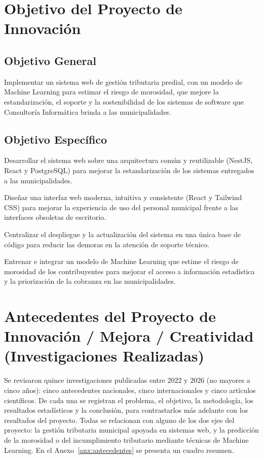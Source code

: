 \documentclass[12pt,a4paper]{report}
\begin{document}
\section{Objetivo del Proyecto de Innovación}

\subsection{Objetivo General}

Implementar un sistema web de gestión tributaria predial, con un modelo de Machine Learning para estimar el riesgo de morosidad, que mejore la estandarización, el soporte y la sostenibilidad de los sistemas de software que Consultoría Informática brinda a las municipalidades.

\subsection{Objetivo Específico}

Desarrollar el sistema web sobre una arquitectura común y reutilizable (NestJS, React y PostgreSQL) para mejorar la estandarización de los sistemas entregados a las municipalidades.

Diseñar una interfaz web moderna, intuitiva y consistente (React y Tailwind CSS) para mejorar la experiencia de uso del personal municipal frente a las interfaces obsoletas de escritorio.

Centralizar el despliegue y la actualización del sistema en una única base de código para reducir las demoras en la atención de soporte técnico.

Entrenar e integrar un modelo de Machine Learning que estime el riesgo de morosidad de los contribuyentes para mejorar el acceso a información estadística y la priorización de la cobranza en las municipalidades.

\section{Antecedentes del Proyecto de Innovación / Mejora / Creatividad (Investigaciones Realizadas)}
\label{sec:antec}

Se revisaron quince investigaciones publicadas entre 2022 y 2026 (no mayores a cinco años): cinco antecedentes nacionales, cinco internacionales y cinco artículos científicos. De cada una se registran el problema, el objetivo, la metodología, los resultados estadísticos y la conclusión, para contrastarlos más adelante con los resultados del proyecto. Todas se relacionan con alguno de los dos ejes del proyecto: la gestión tributaria municipal apoyada en sistemas web, y la predicción de la morosidad o del incumplimiento tributario mediante técnicas de Machine Learning. En el Anexo~\ref{anx:antecedentes} se presenta un cuadro resumen.
\end{document}
